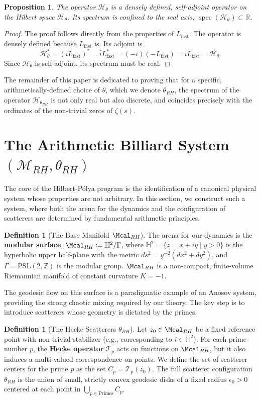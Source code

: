 \documentclass[12pt, letterpaper]{amsart}
\theoremstyle{plain}
\newtheorem{proposition}[theorem]{Proposition}
\theoremstyle{definition}
\newtheorem{definition}[theorem]{Definition}
\theoremstyle{remark}
\newcommand{\Lfast}{L_{\text{fast}}}
\newcommand{\Hcaltheta}{\mathcal{H}_\theta}
\newcommand{\PSL}{\mathrm{PSL}}
\newcommand{\Z}{\mathbb{Z}}
\newcommand{\R}{\mathbb{R}}
\newcommand{\Hyp}{\mathbb{H}^2}
\newcommand{\Hecke}{\mathcal{T}}
\DeclareMathOperator{\spec}{spec}
\begin{document}
\begin{proposition}
The operator $\mathcal{H}_\theta$ is a densely defined, self-adjoint operator on the Hilbert space $\Hcaltheta$. Its spectrum is confined to the real axis, $\spec(\mathcal{H}_\theta) \subset \R$.
\end{proposition}
\begin{proof}
The proof follows directly from the properties of $\Lfast$. The operator is densely defined because $\Lfast$ is. Its adjoint is
$$ \mathcal{H}_\theta^* = (i \Lfast)^* = \bar{i} \Lfast^* = (-i)(-\Lfast) = i\Lfast = \mathcal{H}_\theta. $$
Since $\mathcal{H}_\theta$ is self-adjoint, its spectrum must be real.
\end{proof}

The remainder of this paper is dedicated to proving that for a specific, arithmetically-defined choice of $\theta$, which we denote $\theta_{RH}$, the spectrum of the operator $\mathcal{H}_{\theta_{RH}}$ is not only real but also discrete, and coincides precisely with the ordinates of the non-trivial zeros of $\zeta(s)$.

\section{The Arithmetic Billiard System $(\mathcal{M}_{RH}, \theta_{RH})$}
\label{sec:arithmetic_billiard}

The core of the Hilbert-Pólya program is the identification of a canonical physical system whose properties are not arbitrary. In this section, we construct such a system, where both the arena for the dynamics and the configuration of scatterers are determined by fundamental arithmetic principles.

\begin{definition}[The Base Manifold $\Mcal_{RH}$]
The arena for our dynamics is the \textbf{modular surface}, $\Mcal_{RH} \coloneqq \Hyp / \Gamma$, where $\Hyp = \{ z=x+iy \mid y>0 \}$ is the hyperbolic upper half-plane with the metric $ds^2 = y^{-2}(dx^2+dy^2)$, and $\Gamma = \PSL(2,\Z)$ is the modular group. $\Mcal_{RH}$ is a non-compact, finite-volume Riemannian manifold of constant curvature $K=-1$.
\end{definition}

The geodesic flow on this surface is a paradigmatic example of an Anosov system, providing the strong chaotic mixing required by our theory. The key step is to introduce scatterers whose geometry is dictated by the primes.

\begin{definition}[The Hecke Scatterers $\theta_{RH}$]
Let $z_0 \in \Mcal_{RH}$ be a fixed reference point with non-trivial stabilizer (e.g., corresponding to $i \in \Hyp$). For each prime number $p$, the \textbf{Hecke operator} $\Hecke_p$ acts on functions on $\Mcal_{RH}$, but it also induces a multi-valued correspondence on points. We define the set of scatterer centers for the prime $p$ as the set $C_p = \Hecke_p(z_0)$. The full scatterer configuration $\theta_{RH}$ is the union of small, strictly convex geodesic disks of a fixed radius $\epsilon_0 > 0$ centered at each point in $\bigcup_{p \in \text{Primes}} C_p$.
\end{definition}
\end{document}
